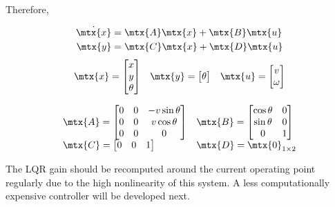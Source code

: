 Therefore,

\begin{theorem}
  \begin{align*}
    \dot{\mtx{x}} &= \mtx{A}\mtx{x} + \mtx{B}\mtx{u} \\
    \mtx{y} &= \mtx{C}\mtx{x} + \mtx{D}\mtx{u}
  \end{align*}
  \begin{equation*}
    \begin{array}{ccc}
      \mtx{x} =
      \begin{bmatrix}
        x \\
        y \\
        \theta \\
      \end{bmatrix} &
      \mtx{y} =
      \begin{bmatrix}
        \theta
      \end{bmatrix} &
      \mtx{u} =
      \begin{bmatrix}
        v \\
        \omega
      \end{bmatrix}
    \end{array}
  \end{equation*}

  \begin{equation}
    \begin{array}{ll}
      \mtx{A} =
      \begin{bmatrix}
        0 & 0 & -v\sin\theta \\
        0 & 0 & v\cos\theta \\
        0 & 0 & 0
      \end{bmatrix} &
      \mtx{B} =
      \begin{bmatrix}
        \cos\theta & 0 \\
        \sin\theta & 0 \\
        0 & 1
      \end{bmatrix} \\
      \mtx{C} =
      \begin{bmatrix}
        0 & 0 & 1
      \end{bmatrix} &
      \mtx{D} = \mtx{0}_{1 \times 2}
    \end{array}
  \end{equation}

  The LQR gain should be recomputed around the current operating point regularly
  due to the high nonlinearity of this system. A less computationally expensive
  controller will be developed next.
\end{theorem}

